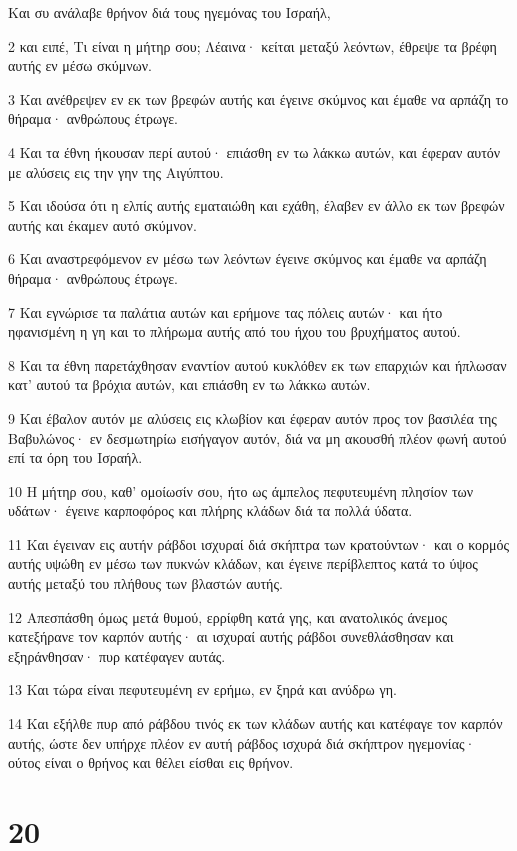 \par Και συ ανάλαβε θρήνον διά τους ηγεμόνας του Ισραήλ,
\par 2 και ειπέ, Τι είναι η μήτηρ σου; Λέαινα· κείται μεταξύ λεόντων, έθρεψε τα βρέφη αυτής εν μέσω σκύμνων.
\par 3 Και ανέθρεψεν εν εκ των βρεφών αυτής και έγεινε σκύμνος και έμαθε να αρπάζη το θήραμα· ανθρώπους έτρωγε.
\par 4 Και τα έθνη ήκουσαν περί αυτού· επιάσθη εν τω λάκκω αυτών, και έφεραν αυτόν με αλύσεις εις την γην της Αιγύπτου.
\par 5 Και ιδούσα ότι η ελπίς αυτής εματαιώθη και εχάθη, έλαβεν εν άλλο εκ των βρεφών αυτής και έκαμεν αυτό σκύμνον.
\par 6 Και αναστρεφόμενον εν μέσω των λεόντων έγεινε σκύμνος και έμαθε να αρπάζη θήραμα· ανθρώπους έτρωγε.
\par 7 Και εγνώρισε τα παλάτια αυτών και ερήμονε τας πόλεις αυτών· και ήτο ηφανισμένη η γη και το πλήρωμα αυτής από του ήχου του βρυχήματος αυτού.
\par 8 Και τα έθνη παρετάχθησαν εναντίον αυτού κυκλόθεν εκ των επαρχιών και ήπλωσαν κατ' αυτού τα βρόχια αυτών, και επιάσθη εν τω λάκκω αυτών.
\par 9 Και έβαλον αυτόν με αλύσεις εις κλωβίον και έφεραν αυτόν προς τον βασιλέα της Βαβυλώνος· εν δεσμωτηρίω εισήγαγον αυτόν, διά να μη ακουσθή πλέον φωνή αυτού επί τα όρη του Ισραήλ.
\par 10 Η μήτηρ σου, καθ' ομοίωσίν σου, ήτο ως άμπελος πεφυτευμένη πλησίον των υδάτων· έγεινε καρποφόρος και πλήρης κλάδων διά τα πολλά ύδατα.
\par 11 Και έγειναν εις αυτήν ράβδοι ισχυραί διά σκήπτρα των κρατούντων· και ο κορμός αυτής υψώθη εν μέσω των πυκνών κλάδων, και έγεινε περίβλεπτος κατά το ύψος αυτής μεταξύ του πλήθους των βλαστών αυτής.
\par 12 Απεσπάσθη όμως μετά θυμού, ερρίφθη κατά γης, και ανατολικός άνεμος κατεξήρανε τον καρπόν αυτής· αι ισχυραί αυτής ράβδοι συνεθλάσθησαν και εξηράνθησαν· πυρ κατέφαγεν αυτάς.
\par 13 Και τώρα είναι πεφυτευμένη εν ερήμω, εν ξηρά και ανύδρω γη.
\par 14 Και εξήλθε πυρ από ράβδου τινός εκ των κλάδων αυτής και κατέφαγε τον καρπόν αυτής, ώστε δεν υπήρχε πλέον εν αυτή ράβδος ισχυρά διά σκήπτρον ηγεμονίας· ούτος είναι ο θρήνος και θέλει είσθαι εις θρήνον.

\chapter{20}

